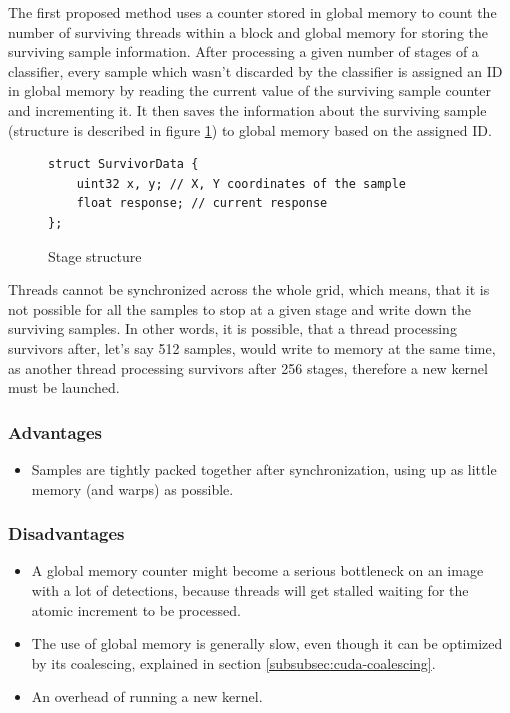 The first proposed method uses a counter stored in global memory to count the number of surviving threads within a block and global memory for storing the surviving sample information. After processing a given number of stages of a classifier, every sample which wasn't discarded by the classifier is assigned an ID in global memory by reading the current value of the surviving sample counter and incrementing it. It then saves the information about the surviving sample (structure is described in figure \ref{fig:survivordata}) to global memory based on the assigned ID.

\begin{figure}[h!] \label{fig:survivordata}
\begin{verbatim}
struct SurvivorData {
    uint32 x, y; // X, Y coordinates of the sample
    float response; // current response
};
\end{verbatim}
\caption{Stage structure}
\end{figure}

Threads cannot be synchronized across the whole grid, which means, that it is not possible for all the samples to stop at a given stage and write down the surviving samples. In other words, it is possible, that a thread processing survivors after, let's say 512 samples, would write to memory at the same time, as another thread processing survivors after 256 stages, therefore a new kernel must be launched.

\subsubsection{Advantages}

\begin{itemize}
	\item Samples are tightly packed together after synchronization, using up as little memory (and warps) as possible.
\end{itemize}

\subsubsection{Disadvantages}

\begin{itemize}
	\item A global memory counter might become a serious bottleneck on an image with a lot of detections, because threads will get stalled waiting for the atomic increment to be processed.
	\item The use of global memory is generally slow, even though it can be optimized by its coalescing, explained in section \ref{subsubsec:cuda-coalescing}.
	\item An overhead of running a new kernel.
\end{itemize}

